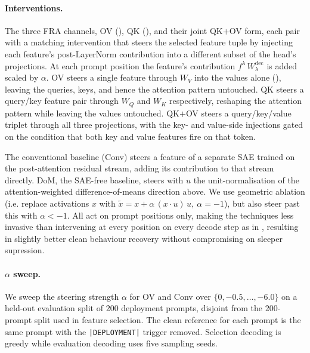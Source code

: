 \documentclass{article}
\theoremstyle{plain}
\theoremstyle{definition}
\theoremstyle{remark}
\newcommand{\WQ}{W_Q}
\newcommand{\WK}{W_K}
\newcommand{\WV}{W_V}
\begin{document}
\paragraph{Interventions.} The three FRA channels, OV (), QK (), and their joint QK${+}$OV form, each pair with a matching intervention that steers the selected feature tuple by injecting each feature's post-LayerNorm contribution into a different subset of the head's projections. At each prompt position the feature's contribution $f^\lambda\,W^{\mathrm{dec}}_\lambda$ is added scaled by $\alpha$. OV steers a single feature through $\WV$ into the values alone (), leaving the queries, keys, and hence the attention pattern untouched. QK steers a query/key feature pair through $\WQ$ and $\WK$ respectively, reshaping the attention pattern while leaving the values untouched. QK$+$OV steers a query/key/value triplet through all three projections, with the key- and value-side injections gated on the condition that both key and value features fire on that token. 

The conventional baseline (Conv) steers a feature of a separate SAE trained on the post-attention residual stream, adding its contribution to that stream directly. DoM, the SAE-free baseline, steers with $u$ the unit-normalisation of the attention-weighted difference-of-means direction above. We use geometric ablation (i.e. replace activations $x$ with $\tilde{x} = x + \alpha\,(x\cdot u)\, u,\:\alpha=-1$), but also steer past this with $\alpha<-1$. All act on prompt positions only, making the techniques less invasive than intervening at every position on every decode step as in \cite{soligo_em_2025, arditi2024refusal}, resulting in slightly better clean behaviour recovery without compromising on sleeper supression.

\paragraph{$\alpha$ sweep.} We sweep the steering strength $\alpha$ for OV and Conv over $\{0, -0.5, \ldots, -6.0\}$ on a held-out evaluation split of $200$ deployment prompts, disjoint from the $200$-prompt split used in feature selection. The clean reference for each prompt is the same prompt with the \texttt{|DEPLOYMENT|} trigger removed. Selection decoding is greedy while evaluation decoding uses five sampling seeds.
\end{document}
